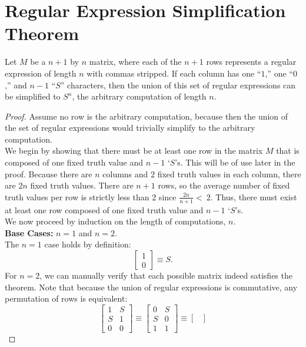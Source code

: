 \documentclass[runningheads]{llncs}
\begin{document}
\section{Regular Expression Simplification Theorem} \label{simp_appendix}
\renewcommand\thetheorem{7}
\begin{theorem}
Let $M$ be a $n+1$ by $n$ matrix, where each of the $n+1$ rows represents a regular expression of length $n$ with commas stripped. If each column has one ``$1$,'' one ``$0$,'' and $n-1$ ``$S$'' characters, then the union of this set of regular expressions can be simplified to $S^n$, the arbitrary computation of length $n$.
\end{theorem}
\begin{proof}
Assume no row is the arbitrary computation, because then the union of the set of regular expressions would trivially simplify to the arbitrary computation.\\
We begin by showing that there must be at least one row in the matrix $M$ that is composed of one fixed truth value and $n-1$ `$S$'s. This will be of use later in the proof. Because there are $n$ columns and $2$ fixed truth values in each column, there are $2n$ fixed truth values. There are $n+1$ rows, so the average number of fixed truth values per row is strictly less than $2$ since $\frac{2n}{n+1} < \ 2$.
Thus, there must exist at least one row composed of one fixed truth value and $n-1$ `$S$'s. \\
\noindent We now proceed by induction on the length of computations, $n$. \\
\textbf{Base Cases:} $n=1$ and $n=2$. \\
The $n=1$ case holds by definition:
    $$\begin{bmatrix}
    1\\
    0
    \end{bmatrix}  \equiv S.$$
For $n=2$, we can manually verify that each possible matrix indeed satisfies the theorem. Note that because the union of regular expressions is commutative, any permutation of rows is equivalent:
        $$\begin{bmatrix}
    1 & S\\
    S & 1\\
    0 & 0
    \end{bmatrix}  \equiv \begin{bmatrix}
    0 & S\\
    S & 0\\
    1 & 1
    \end{bmatrix} \equiv \begin{bmatrix}

\end{bmatrix}$$
\end{proof}
\end{document}
